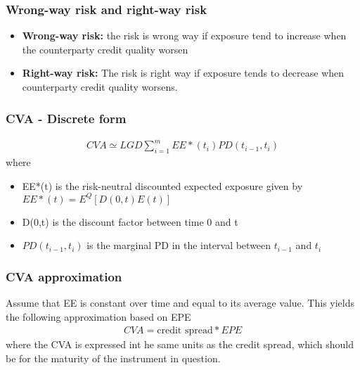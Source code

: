 \documentclass{article}
\theoremstyle{definition}
\theoremstyle{thrm}
\theoremstyle{lma}
\theoremstyle{ppst}
\theoremstyle{crlr}
\begin{document}
\subsubsection{Wrong-way risk and right-way risk}
\begin{itemize}
	\item \textbf{Wrong-way risk: } the risk is wrong way if exposure tend to increase when the counterparty credit quality worsen
	\item \textbf{Right-way risk: } The risk is right way if exposure tends to decrease when counterparty credit quality worsens. 
\end{itemize}

\subsubsection{CVA - Discrete form}
\begin{align*}
	CVA \simeq LGD\sum_{i=1}^m EE*(t_i)PD(t_{i-1}, t_i)
\end{align*}
where
\begin{itemize}
	\item EE*(t) is the risk-neutral discounted expected exposure given by $EE*(t) = E^Q[D(0,t)E(t)]$
	\item D(0,t) is the discount factor between time 0 and t
	\item $PD(t_{i-1}, t_i)$ is the marginal PD in the interval between $t_{i-1}$ and $t_i$
\end{itemize}

\subsubsection{CVA approximation}
Assume that EE is constant over time and equal to its average value. This yields the following approximation based on EPE
\begin{align*}
	CVA = \text{credit spread} * EPE
\end{align*}
where the CVA is expressed int he same units as the credit spread, which should be for the maturity of the instrument in question. 
\end{document}
